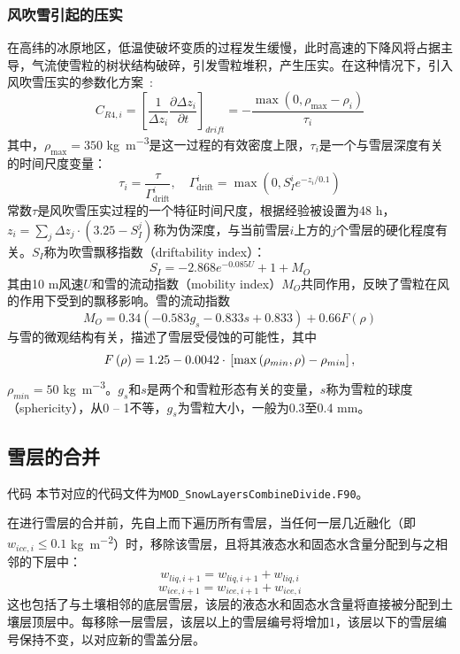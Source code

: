 \subsubsection{风吹雪引起的压实}
在高纬的冰原地区，低温使破坏变质的过程发生缓慢，此时高速的下降风将占据主导，气流使雪粒的树状结构破碎，引发雪粒堆积，产生压实。在这种情况下，引入风吹雪压实的参数化方案~\citep{Vionnet2012}:
\begin{equation}
    C_{R4,i}=\left[\frac{1}{\Delta z_i}\frac{\partial \Delta z_i}{\partial t}\right]_{drift}=-\frac{\max \left(0,\rho_{\text{max}}-\rho_i\right)}{\tau_i}
\end{equation}
其中，$\rho_{\text{max}}=350$ \unit{kg.m^{-3}}是这一过程的有效密度上限，$\tau_i$是一个与雪层深度有关的时间尺度变量：
\begin{equation}
    \tau_i=\frac{\tau}{\Gamma_{\text{drift}}^i}, \quad \Gamma_{\text{drift}}^i=\max \left(0,S_I^i e^{-z_i/0.1}\right)
\end{equation}
常数$\tau$是风吹雪压实过程的一个特征时间尺度，根据经验被设置为48 \unit{h}，$z_i=\sum_j \Delta z_j \cdot \left(3.25-S_I^j\right)$称为伪深度，与当前雪层$i$上方的$j$个雪层的硬化程度有关。$S_I$称为吹雪飘移指数（driftability index）：
\begin{equation}
    S_I=-2.868 e^{-0.085 U} + 1 + M_O
\end{equation}
其由10 \unit{m}风速$U$和雪的流动指数（mobility index）$M_O$共同作用，反映了雪粒在风的作用下受到的飘移影响。雪的流动指数
\begin{equation}
    M_O=0.34\left(-0.583g_s-0.833s+0.833\right)+0.66F\left(\rho\right)
\end{equation}
与雪的微观结构有关，描述了雪层受侵蚀的可能性，其中
$$F\left(\rho\right)=1.25-0.0042 \cdot \\\left[\max \left(\rho_{min},\rho\right)-\rho_{min}\right],$$$\rho_{min}=50$ \unit{kg.m^{-3}}。$g_s$和$s$是两个和雪粒形态有关的变量，$s$称为雪粒的球度（sphericity），从0 -- 1不等，$g_s$为雪粒大小，一般为0.3至0.4 \unit{mm}。


\subsection{雪层的合并}
\begin{mymdframed}{代码}
本节对应的代码文件为\texttt{MOD\_SnowLayersCombineDivide.F90}。
\end{mymdframed}

在进行雪层的合并前，先自上而下遍历所有雪层，当任何一层几近融化（即$w_{ice,i} \leqslant 0.1$ \unit{kg.m^{-2}}）时，移除该雪层，且将其液态水和固态水含量分配到与之相邻的下层中：
\begin{equation}
    w_{liq,i+1} = w_{liq,i+1} + w_{liq,i}
\end{equation}
\begin{equation}
    w_{ice,i+1} = w_{ice,i+1} + w_{ice,i}
\end{equation}
这也包括了与土壤相邻的底层雪层，该层的液态水和固态水含量将直接被分配到土壤层顶层中。每移除一层雪层，该层以上的雪层编号将增加1，该层以下的雪层编号保持不变，以对应新的雪盖分层。

